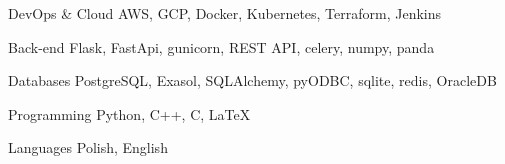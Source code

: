 

\begin{cvskills}

  \cvskill
    {DevOps \& Cloud} %
    {AWS, GCP, Docker, Kubernetes, Terraform, Jenkins} %

  \cvskill
    {Back-end} %
    {Flask, FastApi, gunicorn, REST API, celery, numpy, panda} %

  \cvskill
    {Databases} %
    {PostgreSQL, Exasol, SQLAlchemy, pyODBC, sqlite, redis, OracleDB} %

  \cvskill
    {Programming} %
    {Python, C++, C, \LaTeX\;} %

  \cvskill
    {Languages} %
    {Polish, English} %

\end{cvskills}
